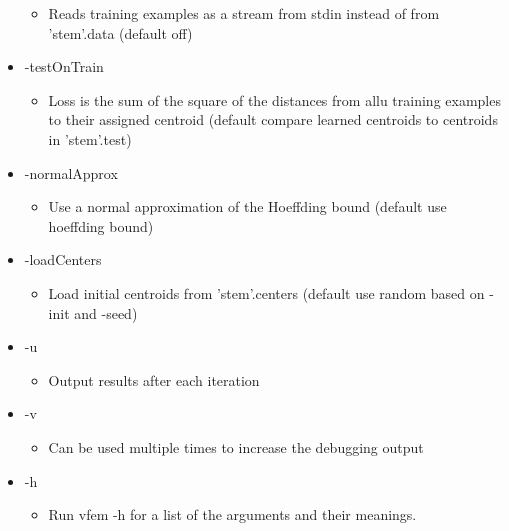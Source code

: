 \begin{itemize}
\begin{itemize}
\item Reads training examples as a stream from stdin instead of from 'stem'.data (default off)\end{itemize}
\item -test\-On\-Train\begin{itemize}
\item Loss is the sum of the square of the distances from allu training examples to their assigned centroid (default compare learned centroids to centroids in 'stem'.test)\end{itemize}
\item -normal\-Approx\begin{itemize}
\item Use a normal approximation of the Hoeffding bound (default use hoeffding bound)\end{itemize}
\item -load\-Centers\begin{itemize}
\item Load initial centroids from 'stem'.centers (default use random based on -init and -seed)\end{itemize}
\item -u\begin{itemize}
\item Output results after each iteration\end{itemize}
\item -v\begin{itemize}
\item Can be used multiple times to increase the debugging output\end{itemize}
\item -h\begin{itemize}
\item Run vfem -h for a list of the arguments and their meanings.\end{itemize}
\end{itemize}


